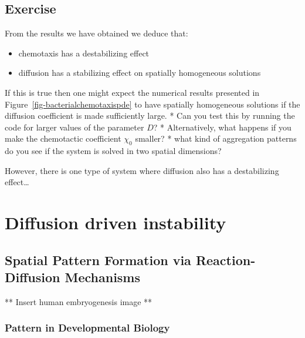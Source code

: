 \documentclass[
  letterpaper,
  DIV=11,
  numbers=noendperiod]{scrreprt}
\providecommand{\tightlist}{%
  \setlength{\itemsep}{0pt}\setlength{\parskip}{0pt}}\usepackage{longtable,booktabs,array}
\theoremstyle{plain}
\theoremstyle{definition}
\theoremstyle{plain}
\theoremstyle{remark}
\begin{document}
\hypertarget{exercise-1}{%
\section{Exercise}\label{exercise-1}}

From the results we have obtained we deduce that:

\begin{itemize}
\tightlist
\item
  chemotaxis has a destabilizing effect
\item
  diffusion has a stabilizing effect on spatially homogeneous solutions
\end{itemize}

If this is true then one might expect the numerical results presented in
Figure~\ref{fig-bacterialchemotaxispde} to have spatially homogeneous
solutions if the diffusion coefficient is made sufficiently large. * Can
you test this by running the code for larger values of the parameter
\(D\)? * Alternatively, what happens if you make the chemotactic
coefficient \(\chi_0\) smaller? * what kind of aggregation patterns do
you see if the system is solved in two spatial dimensions?

However, there is one type of system where diffusion also has a
destabilizing effect\ldots{}

\hypertarget{diffusion-driven-instability}{%
\chapter{Diffusion driven
instability}\label{diffusion-driven-instability}}

\hypertarget{spatial-pattern-formation-via-reaction-diffusion-mechanisms}{%
\section{Spatial Pattern Formation via Reaction-Diffusion
Mechanisms}\label{spatial-pattern-formation-via-reaction-diffusion-mechanisms}}

** Insert human embryogenesis image **

\hypertarget{pattern-in-developmental-biology}{%
\subsection{Pattern in Developmental
Biology}\label{pattern-in-developmental-biology}}
\end{document}
